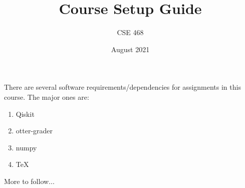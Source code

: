 \documentclass[12pt]{article}
\title{Course Setup Guide}
\author{CSE 468}
\date{August 2021}
\begin{document}
\maketitle

There are several software requirements/dependencies for assignments in this course. The major ones are: \begin{enumerate}
    \item Qiskit
    \item otter-grader
    \item numpy
    \item TeX
\end{enumerate}


More to follow...

\end{document}
